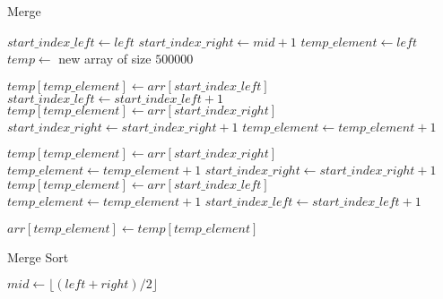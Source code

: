 \documentclass{article}
\begin{document}
\begin{algorithm}
\caption{Merge}
\begin{algorithmic}[1]
    \State $start\_index\_left \gets left$
    \State $start\_index\_right \gets mid + 1$
    \State $temp\_element \gets left$
    \State $temp \gets$ new array of size $500000$

            \State $temp[temp\_element] \gets arr[start\_index\_left]$
            \State $start\_index\_left \gets start\_index\_left + 1$
        \Else
            \State $temp[temp\_element] \gets arr[start\_index\_right]$
            \State $start\_index\_right \gets start\_index\_right + 1$
        \EndIf
        \State $temp\_element \gets temp\_element + 1$
    \EndWhile

            \State $temp[temp\_element] \gets arr[start\_index\_right]$
            \State $temp\_element \gets temp\_element + 1$
            \State $start\_index\_right \gets start\_index\_right + 1$
        \EndWhile
    \Else
            \State $temp[temp\_element] \gets arr[start\_index\_left]$
            \State $temp\_element \gets temp\_element + 1$
            \State $start\_index\_left \gets start\_index\_left + 1$
        \EndWhile
    \EndIf

        \State $arr[temp\_element] \gets temp[temp\_element]$
    \EndFor
\EndProcedure
\end{algorithmic}
\end{algorithm}

\begin{algorithm}
\caption{Merge Sort}
\begin{algorithmic}[1]
        \State $mid \gets \lfloor(left + right) / 2\rfloor$
        \State {}
        \State {}
        \State {}
    \EndIf
\EndProcedure
\end{algorithmic}
\end{algorithm}
\end{document}
